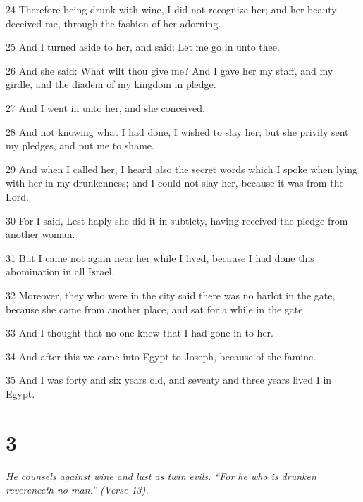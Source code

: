 \par 24 Therefore being drunk with wine, I did not recognize her; and her beauty deceived me, through the fashion of her adorning.

\par 25 And I turned aside to her, and said: Let me go in unto thee.

\par 26 And she said: What wilt thou give me? And I gave her my staff, and my girdle, and the diadem of my kingdom in pledge.

\par 27 And I went in unto her, and she conceived.

\par 28 And not knowing what I had done, I wished to slay her; but she privily sent my pledges, and put me to shame.

\par 29 And when I called her, I heard also the secret words which I spoke when lying with her in my drunkenness; and I could not slay her, because it was from the Lord.

\par 30 For I said, Lest haply she did it in subtlety, having received the pledge from another woman.

\par 31 But I came not again near her while I lived, because I had done this abomination in all Israel.

\par 32 Moreover, they who were in the city said there was no harlot in the gate, because she came from another place, and sat for a while in the gate.

\par 33 And I thought that no one knew that I had gone in to her.

\par 34 And after this we came into Egypt to Joseph, because of the famine.

\par 35 And I was forty and six years old, and seventy and three years lived I in Egypt.

\chapter{3}

\par \textit{He counsels against wine and lust as twin evils. “For he who is drunken reverenceth no man.” (Verse 13).}

